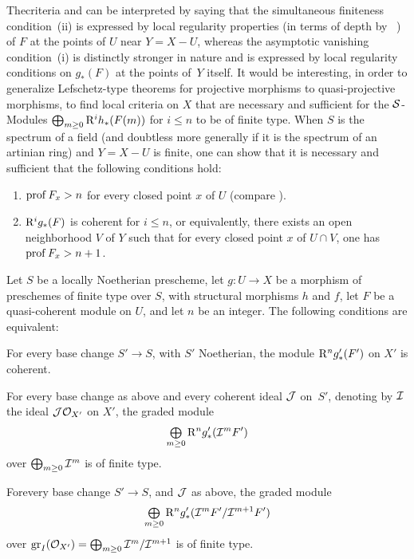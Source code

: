 \begin{remarque} \label{XII.5.6}
The\pageoriginale criteria  and  can be interpreted by saying that the \og simultaneous finiteness condition\fg {}~(ii) is expressed by local regularity properties (in terms of depth by ~) of $F$ at the points of $U$ near $Y=X- U$, whereas the \og asymptotic vanishing condition\fg {}~(i) is distinctly stronger in nature and is expressed by local regularity conditions on $g_\ast(F)$ at the points of~$Y$ itself. It would be interesting, in order to generalize Lefschetz-type theorems for projective morphisms to quasi-projective morphisms, to find local criteria on $X$ that are necessary and sufficient for the $\mathcal S$-Modules $\bigoplus_{m\geq 0} \mathrm R^ih_\ast(F(m))$ for $i\leq n$ to be of finite type. When $S$ is the spectrum of a field (and doubtless more generally if it is the spectrum of an artinian ring) and $Y=X- U$ is finite, one can show that it is necessary and sufficient that the following conditions hold:
\begin{enumerate}
\item[\textup{1\noo)}] $\operatorname{prof} F_x >n$ for every closed point $x$ of $U$ (compare ).
\item[\textup{2\noo)}] $\mathrm R^ig_\ast(F)$ is coherent for $i\leq n$, or equivalently, there exists an open neighborhood $V$ of $Y$ such that for every closed point $x$ of $U\cap V$, one has $\operatorname{prof} F_x >n+1$.
\end{enumerate}
\end{remarque}

\begin{proposition} \label{XII.5.7}
Let $S$ be a locally Noetherian prescheme, let $g:U\to X$ be a morphism of preschemes of finite type over $S$, with structural morphisms $h$ and $f$, let $F$ be a quasi-coherent module on $U$, and let $n$ be an integer. The following conditions are equivalent:
\begin{enumeratei}
\item
For every base change $S'\to S$, with $S'$ Noetherian, the module $\mathrm R^ng'_\ast(F')$ on $X'$ is coherent.
\item
For every base change as above and every coherent ideal $\mathcal J$ on~$S'$, denoting by $\mathcal I$ the ideal $\mathcal J\mathcal O_{X'}$ on $X'$, the graded module
\[
\mathop{\textstyle\bigoplus}\limits_{m\geq 0} \mathrm R^ng'_\ast(\mathcal I^mF')
\]
over $\bigoplus_{m\geq 0} \mathcal I^m$ is of finite type.
\item
For\pageoriginale every base change $S'\to S$, and $\mathcal J$ as above, the graded module
\[
\mathop{\textstyle\bigoplus}\limits_{m\geq 0} \mathrm R^ng'_\ast(\mathcal I^mF'/\mathcal I^{m+1}F')
\]
over $\operatorname{gr}_I(\mathcal O_{X'})=\bigoplus_{m\geq 0} \mathcal I^m/\mathcal I^{m+1}$ is of finite type.
\end{enumeratei}
\end{proposition}

